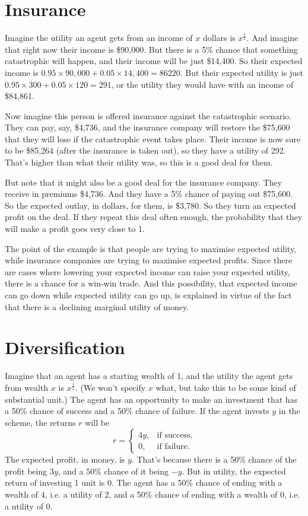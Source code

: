 \section{Insurance}
Imagine the utility an agent gets from an income of $x$ dollars is $x^{\frac{1}{2}}$. And imagine that right now their income is \$90,000. But there is a 5\% chance that something catastrophic will happen, and their income will be just \$14,400. So their expected income is $0.95 \times 90,000 + 0.05 \times 14,400 = 86220$. But their expected utility is just $0.95 \times 300 + 0.05 \times 120 = 291$, or the utility they would have with an income of \$84,861.

Now imagine this person is offered insurance against the catastrophic scenario. They can pay, say, \$4,736, and the insurance company will restore the \$75,600 that they will lose if the catastrophic event takes place. Their income is now sure to be \$85,264 (after the insurance is taken out), so they have a utility of 292. That's higher than what their utility was, so this is a good deal for them.

But note that it might also be a good deal for the insurance company. They receive in premiums \$4,736. And they have a 5\% chance of paying out \$75,600. So the expected outlay, in dollars, for them, is \$3,780. So they turn an expected profit on the deal. If they repeat this deal often enough, the probability that they will make a profit goes very close to 1.

The point of the example is that people are trying to maximise expected utility, while insurance companies are trying to maximise expected profits. Since there are cases where lowering your expected income can raise your expected utility, there is a chance for a win-win trade. And this possibility, that expected income can go down while expected utility can go up, is explained in virtue of the fact that there is a declining marginal utility of money. 

\section{Diversification}
Imagine that an agent has a starting wealth of 1, and the utility the agent gets from wealth $x$ is $x^{\frac{1}{2}}$. (We won't specify $x$ what, but take this to be some kind of substantial unit.) The agent has an opportunity to make an investment that has a 50\% chance of success and a 50\% chance of failure. If the agent invests $y$ in the scheme, the returns $r$ will be
\begin{equation*}
r = \begin{cases}4y,& \text{if success} ,\\ 0,& \text{if failure} .\end{cases}
\end{equation*}
The expected profit, in money, is $y$. That's because there is a 50\% chance of the profit being $3y$, and a 50\% chance of it being $-y$. But in utility, the expected return of investing 1 unit is 0. The agent has a 50\% chance of ending with a wealth of 4, i.e. a utility of 2, and a 50\% chance of ending with a wealth of 0, i.e. a utility of 0.


